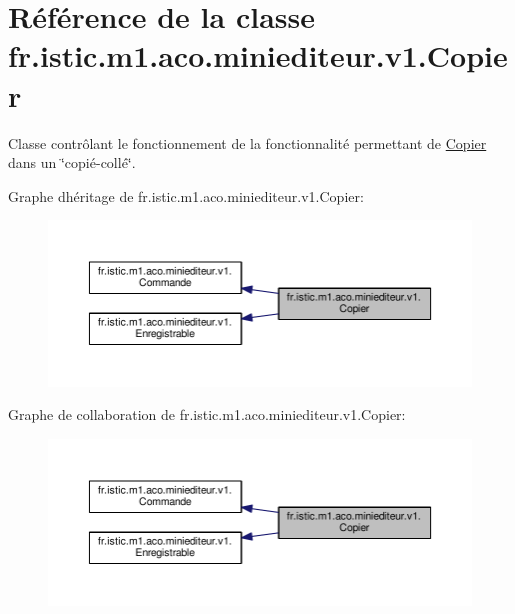 \hypertarget{classfr_1_1istic_1_1m1_1_1aco_1_1miniediteur_1_1v1_1_1Copier}{}\section{Référence de la classe fr.\+istic.\+m1.\+aco.\+miniediteur.\+v1.\+Copier}
\label{classfr_1_1istic_1_1m1_1_1aco_1_1miniediteur_1_1v1_1_1Copier}


Classe contrôlant le fonctionnement de la fonctionnalité permettant de \hyperlink{classfr_1_1istic_1_1m1_1_1aco_1_1miniediteur_1_1v1_1_1Copier}{Copier} dans un \char`\"{}copié-\/collé\char`\"{}.  




Graphe d\textquotesingle{}héritage de fr.\+istic.\+m1.\+aco.\+miniediteur.\+v1.\+Copier\+:
\nopagebreak
\begin{figure}[H]
\begin{center}
\leavevmode
\includegraphics[width=350pt]{classfr_1_1istic_1_1m1_1_1aco_1_1miniediteur_1_1v1_1_1Copier__inherit__graph}
\end{center}
\end{figure}


Graphe de collaboration de fr.\+istic.\+m1.\+aco.\+miniediteur.\+v1.\+Copier\+:
\nopagebreak
\begin{figure}[H]
\begin{center}
\leavevmode
\includegraphics[width=350pt]{classfr_1_1istic_1_1m1_1_1aco_1_1miniediteur_1_1v1_1_1Copier__coll__graph}
\end{center}
\end{figure}
